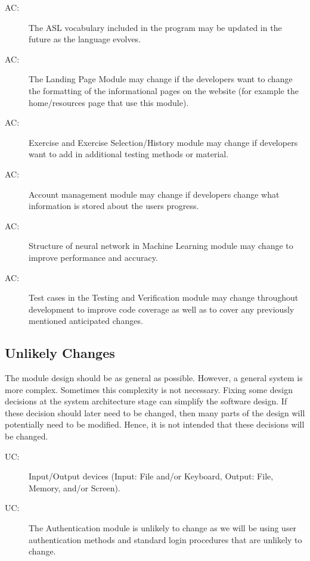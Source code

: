 \documentclass[12pt, titlepage]{article}
\newcounter{acnum}
\newcommand{\actheacnum}{AC\theacnum}
\newcounter{ucnum}
\newcommand{\uctheucnum}{UC\theucnum}
\begin{document}
\begin{description}
\item[ \actheacnum \label{acInfo}:] The ASL vocabulary included in the program may be updated in the future as the language evolves.
\item[ \actheacnum \label{acAbout}:] The Landing Page Module may change if the developers want to change the formatting of the informational pages on the website (for example the home/resources page that use this module). 
\item[ \actheacnum \label{acExercise}:] Exercise and Exercise Selection/History module may change if developers want to add in additional testing methods or material.
\item[ \actheacnum \label{acAccount}:] Account management module may change if developers change what information is stored about the users progress. 
\item[ \actheacnum \label{acMLModel}:] Structure of neural network in Machine Learning module may change to improve performance and accuracy.
\item[ \actheacnum \label{acTestVerif}:] Test cases in the Testing and Verification module may change throughout development to improve code coverage as well as to cover any previously mentioned anticipated changes.
\end{description}

\subsection{Unlikely Changes} \label{SecUchange}

The module design should be as general as possible. However, a general system is
more complex. Sometimes this complexity is not necessary. Fixing some design
decisions at the system architecture stage can simplify the software design. If
these decision should later need to be changed, then many parts of the design
will potentially need to be modified. Hence, it is not intended that these
decisions will be changed.

\begin{description}
\item[ \uctheucnum \label{ucIO}:] Input/Output devices
  (Input: File and/or Keyboard, Output: File, Memory, and/or Screen).
\item[ \uctheucnum \label{ucLogin}:] The Authentication module is unlikely to change as we will be using user authentication methods and standard login procedures that are unlikely to change.
\end{description}
\end{document}
